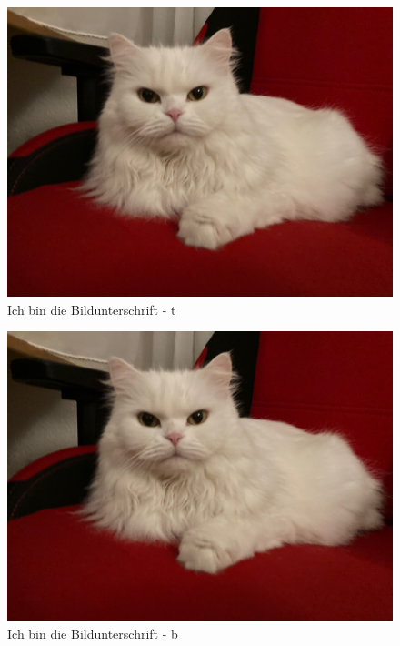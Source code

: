 \documentclass[12pt,ngerman,parskip=half]{scrartcl}
\begin{document}
\blindtext[2]

\begin{figure}[t] %
\includegraphics[width=\textwidth]{Bilder/Katze}
\caption{Ich bin die Bildunterschrift - t}
\end{figure}

\blindtext[2]


\begin{figure}[h] %
\includegraphics[width=\textwidth]{Bilder/Katze}
\caption{Ich bin die Bildunterschrift - b}
\end{figure} 

\blindtext[2]
\end{document}
